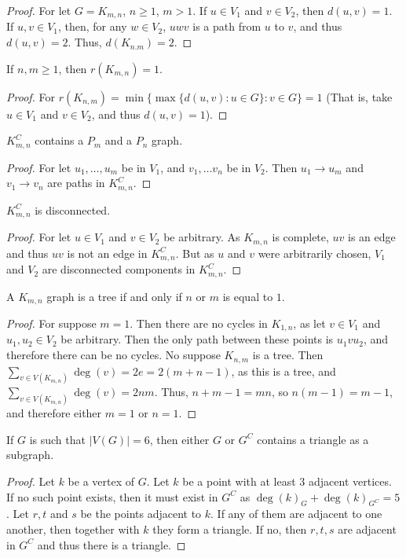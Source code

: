 \documentclass[crop=false,class=book,oneside]{standalone}
\begin{document}
\begin{proof}
For let $G=K_{m,n}$, $n\geq1$, $m> 1$. If $u\in V_1$ and $v\in V_2$, then $d(u,v) = 1$. If $u,v\in V_1$, then, for any $w\in V_2$, $uwv$ is a path from $u$ to $v$, and thus $d(u,v) = 2$. Thus, $d(K_{n.m}) = 2$.
\end{proof}
\begin{corollary}
If $n,m\geq 1$, then $r(K_{m,n}) = 1$.
\end{corollary}
\begin{proof}
For $r(K_{n,m}) = \min\{ \max\{d(u,v):u\in G\}: v\in G\} = 1$ (That is, take $u\in V_1$ and $v\in V_2$, and thus $d(u,v)=1$).
\end{proof}
\begin{corollary}
$K_{m,n}^C$ contains a $P_m$ and a $P_n$ graph.
\end{corollary}
\begin{proof}
For let $u_1,\hdots, u_m$ be in $V_1$, and $v_1,\hdots v_n$ be in $V_2$. Then $u_1 \rightarrow u_m$ and $v_1 \rightarrow v_n$ are paths in $K_{m,n}^C$.
\end{proof}
\begin{theorem}
$K_{m,n}^C$ is disconnected.
\end{theorem}
\begin{proof}
For let $u\in V_1$ and $v\in V_2$ be arbitrary. As $K_{m,n}$ is complete, $uv$ is an edge and thus $uv$ is not an edge in $K_{m,n}^C$. But as $u$ and $v$ were arbitrarily chosen, $V_1$ and $V_2$ are disconnected components in $K_{m,n}^C$.
\end{proof}
\begin{theorem}
A $K_{m,n}$ graph is a tree if and only if $n$ or $m$ is equal to $1$.
\end{theorem}
\begin{proof}
For suppose $m=1$. Then there are no cycles in $K_{1,n}$, as let $v\in V_1$ and $u_1,u_2\in V_2$ be arbitrary. Then the only path between these points is $u_1 v u_2$, and therefore there can be no cycles. No suppose $K_{n,m}$ is a tree. Then $\sum_{v\in V(K_{m,n})}\deg(v) = 2e=2(m+n-1)$, as this is a tree, and $\sum_{v\in V(K_{m,n})}\deg(v) = 2nm$. Thus, $n+m-1=mn$, so $n(m-1)=m-1$, and therefore either $m=1$ or $n=1$.
\end{proof}
\begin{theorem}
If $G$ is such that $|V(G)|=6$, then either $G$ or $G^C$ contains a triangle as a subgraph.
\end{theorem}
\begin{proof}
Let $k$ be a vertex of $G$. Let $k$ be a point with at least $3$ adjacent vertices. If no such point exists, then it must exist in $G^C$ as $\deg(k)_G+\deg(k)_{G^C}=5$. Let $r,t$ and $s$ be the points adjacent to $k$. If any of them are adjacent to one another, then together with $k$ they form a triangle. If no, then $r,t,s$ are adjacent in $G^C$ and thus there is a triangle.
\end{proof}
\end{document}
